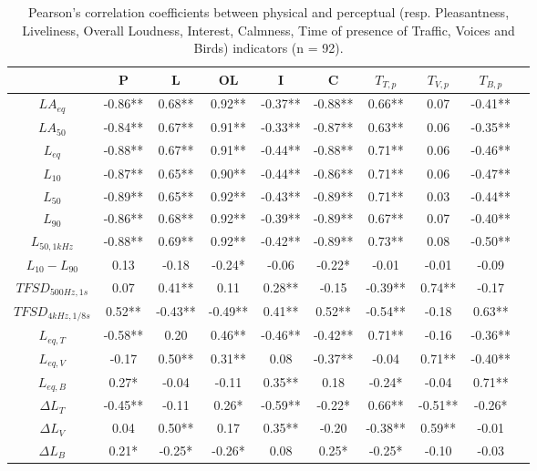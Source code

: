 \documentclass[twocolumn]{article}
\begin{document}
\begin{table}[ht!]
\centering
\caption{Pearson's correlation coefficients between physical and perceptual (resp. Pleasantness, Liveliness, Overall Loudness, Interest, Calmness, Time of presence of Traffic, Voices and Birds) indicators (n = 92).}
\label{tab:physc}
\begin{threeparttable}[t]
\begin{tabular}{ c | c c c c c | c c c c }
\hline
	 & P & L & OL & I & C & $T_{T, p}$ & $T_{V, p}$ & $T_{B, p}$ \\ \hline
	$LA_{eq}$ & -0.86** & 0.68** & 0.92** & -0.37** & -0.88** & 0.66** & 0.07 & -0.41** \\
	$LA_{50}$ & -0.84** & 0.67** & 0.91** & -0.33** & -0.87** & 0.63** & 0.06 & -0.35** \\
	$L_{eq}$ & -0.88** & 0.67** & 0.91** & -0.44** & -0.88** & 0.71** & 0.06 & -0.46** \\
	$L_{10}$ & -0.87** & 0.65** & 0.90** & -0.44** & -0.86** & 0.71** & 0.06 & -0.47** \\
	$L_{50}$ & -0.89** & 0.65** & 0.92** & -0.43** & -0.89** & 0.71** & 0.03 & -0.44** \\
	$L_{90}$ & -0.86** & 0.68** & 0.92** & -0.39** & -0.89** & 0.67** & 0.07 & -0.40** \\
	$L_{50, 1kHz}$ & -0.88** & 0.69** & 0.92** & -0.42** & -0.89** & 0.73** & 0.08 & -0.50** \\
	$L_{10}-L_{90}$ & 0.13 & -0.18 & -0.24* & -0.06 & -0.22* & -0.01 & -0.01 & -0.09 \\ \hline
	$TFSD_{500Hz, 1s}$ & 0.07 & 0.41** & 0.11 & 0.28** & -0.15 & -0.39** & 0.74** & -0.17 \\
	$TFSD_{4kHz, 1/8s}$ & 0.52** & -0.43** & -0.49** & 0.41** & 0.52** & -0.54** & -0.18 & 0.63** \\ \hline
	$L_{eq, T}$ & -0.58** & 0.20 & 0.46** & -0.46** & -0.42** & 0.71** & -0.16 & -0.36** \\
	$L_{eq, V}$ & -0.17 & 0.50** & 0.31** & 0.08 & -0.37** & -0.04 & 0.71** & -0.40** \\
	$L_{eq, B}$ & 0.27* & -0.04 & -0.11 & 0.35** & 0.18 & -0.24* & -0.04 & 0.71** \\ \hline
	$\Delta L_T$ & -0.45** & -0.11 & 0.26* & -0.59** & -0.22* & 0.66** & -0.51** & -0.26* \\
	$\Delta L_V$ & 0.04 & 0.50** & 0.17 & 0.35** & -0.20 & -0.38** & 0.59** & -0.01 \\
	$\Delta L_B$ & 0.21* & -0.25* & -0.26* & 0.08 & 0.25* & -0.25* & -0.10 & -0.03 \\ \hline

\end{tabular}
\end{threeparttable}
\end{table}
\end{document}
